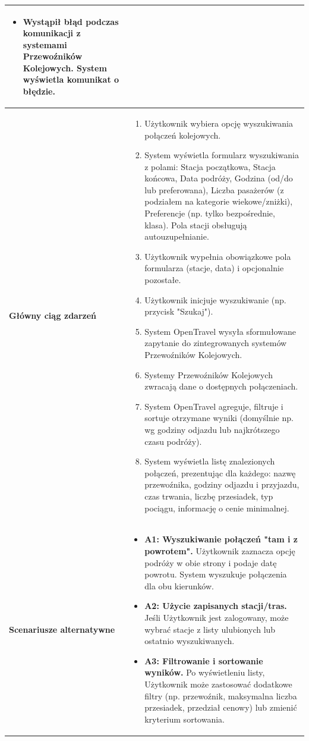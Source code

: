\documentclass[a4paper,12pt]{article}
\begin{document}
\begin{longtable}{|p{\pierwszakolumnaszerokoscPUBKWyszukiwanie}|p{\drugakolumnaszerokoscPUBKWyszukiwanie}|}
\begin{itemize}
            \item Wystąpił błąd podczas komunikacji z systemami Przewoźników Kolejowych. System wyświetla komunikat o błędzie.
        \end{itemize} \\
    \hline
    \textbf{Główny ciąg zdarzeń} &
        \begin{enumerate} \itemsep0pt \parskip0pt \parsep0pt
            \item Użytkownik wybiera opcję wyszukiwania połączeń kolejowych.
            \item System wyświetla formularz wyszukiwania z polami: Stacja początkowa, Stacja końcowa, Data podróży, Godzina (od/do lub preferowana), Liczba pasażerów (z podziałem na kategorie wiekowe/zniżki), Preferencje (np. tylko bezpośrednie, klasa). Pola stacji obsługują autouzupełnianie.
            \item Użytkownik wypełnia obowiązkowe pola formularza (stacje, data) i opcjonalnie pozostałe.
            \item Użytkownik inicjuje wyszukiwanie (np. przycisk "Szukaj").
            \item System OpenTravel wysyła sformułowane zapytanie do zintegrowanych systemów Przewoźników Kolejowych.
            \item Systemy Przewoźników Kolejowych zwracają dane o dostępnych połączeniach.
            \item System OpenTravel agreguje, filtruje i sortuje otrzymane wyniki (domyślnie np. wg godziny odjazdu lub najkrótszego czasu podróży).
            \item System wyświetla listę znalezionych połączeń, prezentując dla każdego: nazwę przewoźnika, godziny odjazdu i przyjazdu, czas trwania, liczbę przesiadek, typ pociągu, informację o cenie minimalnej.
        \end{enumerate} \\
    \hline
    \textbf{Scenariusze alternatywne} &
        \begin{itemize} \itemsep0pt \parskip0pt \parsep0pt
            \item \textbf{A1: Wyszukiwanie połączeń "tam i z powrotem".} Użytkownik zaznacza opcję podróży w obie strony i podaje datę powrotu. System wyszukuje połączenia dla obu kierunków.
            \item \textbf{A2: Użycie zapisanych stacji/tras.} Jeśli Użytkownik jest zalogowany, może wybrać stacje z listy ulubionych lub ostatnio wyszukiwanych.
            \item \textbf{A3: Filtrowanie i sortowanie wyników.} Po wyświetleniu listy, Użytkownik może zastosować dodatkowe filtry (np. przewoźnik, maksymalna liczba przesiadek, przedział cenowy) lub zmienić kryterium sortowania.

\end{itemize}
\end{longtable}
\end{document}

